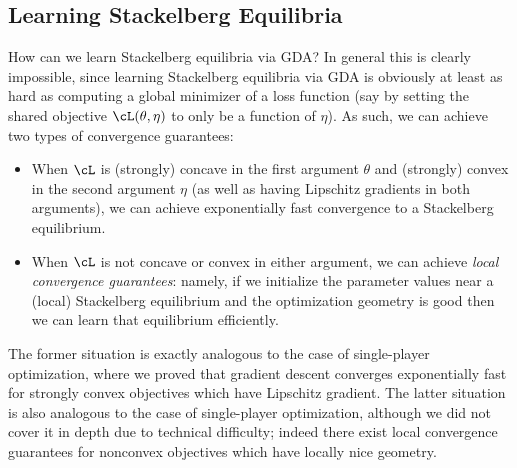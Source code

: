\documentclass[../../book-main.tex]{subfiles}
\begin{document}
\subsection{Learning Stackelberg Equilibria}

How can we learn Stackelberg equilibria via GDA? In general this is clearly impossible, since learning Stackelberg equilibria via GDA is obviously at least as hard as computing a global minimizer of a loss function (say by setting the shared objective \(\cL(\theta, \eta)\) to only be a function of \(\eta\)). As such, we can achieve two types of convergence guarantees:
\begin{itemize}
    \item When \(\cL\) is (strongly) concave in the first argument \(\theta\) and (strongly) convex in the second argument \(\eta\) (as well as having Lipschitz gradients in both arguments), we can achieve exponentially fast convergence to a Stackelberg equilibrium.
    \item When \(\cL\) is not concave or convex in either argument, we can achieve \textit{local convergence guarantees}: namely, if we initialize the parameter values near a (local) Stackelberg equilibrium and the optimization geometry is good then we can learn that equilibrium efficiently. 
\end{itemize}

The former situation is exactly analogous to the case of single-player optimization, where we proved that gradient descent converges exponentially fast for strongly convex objectives which have Lipschitz gradient. The latter situation is also analogous to the case of single-player optimization, although we did not cover it in depth due to technical difficulty; indeed there exist local convergence guarantees for nonconvex objectives which have locally nice geometry.
\end{document}
